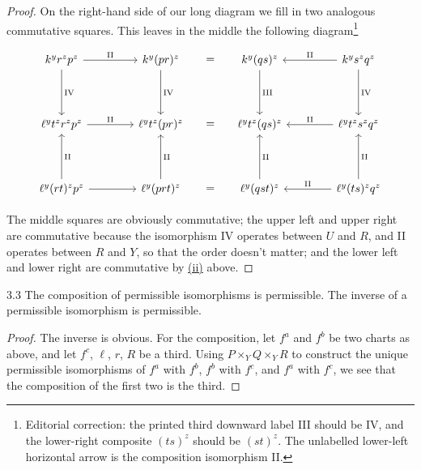 \begin{proof}
On the right-hand side of our long diagram we fill in two analogous commutative squares. This leaves in the middle the following diagram\footnote{Editorial correction: the printed third downward label III should be IV, and the lower-right composite $(ts)^z$ should be $(st)^z$. The unlabelled lower-left horizontal arrow is the composition isomorphism II.}

	\[
	\begin{tikzcd}[row sep=1.4cm, column sep=1.4cm]
		k^y r^z p^z \arrow[r, "\mathrm{II}"] \arrow[d, "\mathrm{IV}"] &
		k^y(pr)^z \arrow[r, phantom, "="] \arrow[d, "\mathrm{IV}"] &
		k^y(qs)^z \arrow[d, "\mathrm{III}"] &
		k^y s^z q^z \arrow[l, "\mathrm{II}"'] \arrow[d, "\mathrm{IV}"] \\
		\ell^y t^z r^z p^z \arrow[r, "\mathrm{II}"] &
		\ell^y t^z(pr)^z \arrow[r, phantom, "="] &
		\ell^y t^z(qs)^z &
		\ell^y t^z s^z q^z \arrow[l, "\mathrm{II}"'] \\
		\ell^y(rt)^z p^z \arrow[r] \arrow[u, "\mathrm{II}"'] &
		\ell^y(prt)^z \arrow[r, phantom, "="] \arrow[u, "\mathrm{II}"'] &
		\ell^y(qst)^z \arrow[u, "\mathrm{II}"'] &
		\ell^y(ts)^z q^z \arrow[l, "\mathrm{II}"'] \arrow[u, "\mathrm{II}"']
	\end{tikzcd}
	\]

The middle squares are obviously commutative; the upper left and upper right are commutative because the isomorphism IV operates between $U$ and $R$, and II operates between $R$ and $Y$, so that the order doesn't matter; and the lower left and lower right are commutative by \hyperref[compat:6.2.ii]{(ii)} above.

\end{proof}

\begin{booklemma}{3.3}\label{lem:6.3.3}
The composition of permissible isomorphisms is permissible. The inverse of a permissible isomorphism is permissible.
\end{booklemma}

\begin{proof}
The inverse is obvious. For the composition, let $f^{a}$ and $f^{b}$ be two charts as above, and let $f^{c}$, $\ell$, $r$, $R$ be a third. Using $P\times_Y Q\times_Y R$ to construct the unique permissible isomorphisms of $f^{a}$ with $f^{b}$, $f^{b}$ with $f^{c}$, and $f^{a}$ with $f^{c}$, we see that the composition of the first two is the third.
\end{proof}

\par\endgroup

